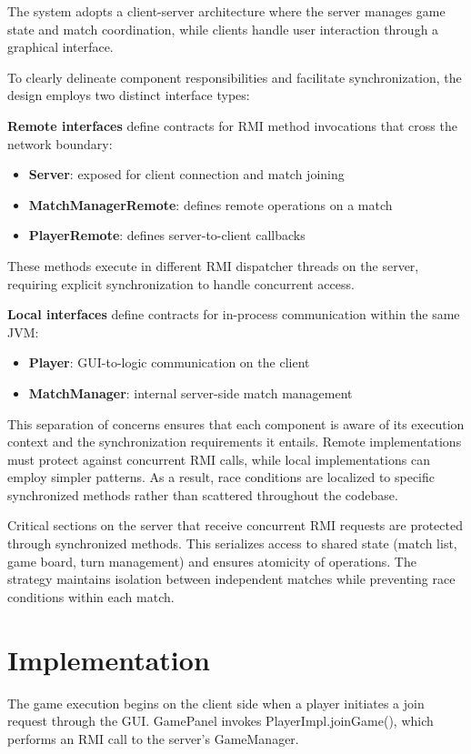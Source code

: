 \documentclass{scrartcl}
\begin{document}
The system adopts a client-server architecture where the server manages 
game state and match coordination, while clients handle user interaction 
through a graphical interface.

To clearly delineate component responsibilities and facilitate synchronization, 
the design employs two distinct interface types:

\textbf{Remote interfaces} define contracts for RMI method invocations that 
cross the network boundary:
\begin{itemize}
    \item \textbf{Server}: exposed for client connection and match joining
    \item \textbf{MatchManagerRemote}: defines remote operations on a match
    \item \textbf{PlayerRemote}: defines server-to-client callbacks
\end{itemize}
These methods execute in different RMI dispatcher threads on the server, 
requiring explicit synchronization to handle concurrent access.

\textbf{Local interfaces} define contracts for in-process communication 
within the same JVM:
\begin{itemize}
    \item \textbf{Player}: GUI-to-logic communication on the client
    \item \textbf{MatchManager}: internal server-side match management
\end{itemize}
This separation of concerns ensures that each component is aware of its 
execution context and the synchronization requirements it entails. Remote 
implementations must protect against concurrent RMI calls, while local 
implementations can employ simpler patterns. As a result, race conditions 
are localized to specific synchronized methods rather than scattered 
throughout the codebase.

Critical sections on the server that receive concurrent RMI requests are 
protected through synchronized methods. This serializes access to shared 
state (match list, game board, turn management) and ensures atomicity of 
operations. The strategy maintains isolation between independent matches 
while preventing race conditions within each match.

    \section{Implementation}

The game execution begins on the client side when a player initiates a join 
request through the GUI. GamePanel invokes PlayerImpl.joinGame(), which 
performs an RMI call to the server's GameManager.
\end{document}
